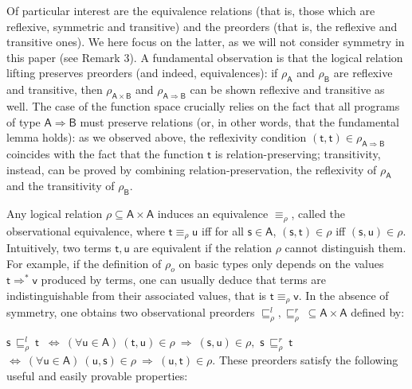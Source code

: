 \documentclass[10pt,a4paper]{amsart}
\begin{document}
Of particular interest are the equivalence relations (that is, those which are reflexive, symmetric and transitive) and the preorders (that is, the reflexive and transitive ones). We here focus on the latter, as we will not consider symmetry in this paper (see Remark 3). A fundamental observation is that the logical relation lifting preserves preorders (and indeed, equivalences): if $\rho_{\mathsf{A}}$ and $\rho_{\mathsf{B}}$ are reflexive and transitive, then $\rho_{\mathsf{A}\times\mathsf{B}}$ and $\rho_{\mathsf{A}\Rightarrow\mathsf{B}}$ can be shown reflexive and transitive as well. The case of the function space crucially relies on the fact that all programs of type $\mathsf{A}\Rightarrow\mathsf{B}$ must preserve relations (or, in other words, that the fundamental lemma holds): as we observed above, the reflexivity condition $(\mathsf{t},\mathsf{t})\in\rho_{\mathsf{A}\Rightarrow\mathsf{B}}$ coincides with the fact that the function $\mathsf{t}$ is relation-preserving; transitivity, instead, can be proved by combining relation-preservation, the reflexivity of $\rho_{\mathsf{A}}$ and the transitivity of $\rho_{\mathsf{B}}$.\par
 
 
 
Any logical relation $\rho\subseteq\mathsf{A}\times\mathsf{A}$ induces an equivalence $\equiv_{\rho}$, called the observational equivalence, where $\mathsf{t}\equiv_{\rho}\mathsf{u}$ iff for all $\mathsf{s}\in\mathsf{A}$, $(\mathsf{s},\mathsf{t})\in\rho$ iff $(\mathsf{s},\mathsf{u})\in\rho$. Intuitively, two terms $\mathsf{t},\mathsf{u}$ are equivalent if the relation $\rho$ cannot distinguish them. For example, if the definition of $\rho_{o}$ on basic types only depends on the values $\mathsf{t}\Rightarrow^{*}\mathsf{v}$ produced by terms, one can usually deduce that terms are indistinguishable from their associated values, that is $\mathsf{t}\equiv_{\rho}\mathsf{v}$. In the absence of symmetry, one obtains two observational preorders $\sqsubseteq^{l}_{\rho},\sqsubseteq^{r}_{\rho}\ \subseteq\mathsf{A}\times%
\mathsf{A}$ defined by:\par
    $\displaystyle\mathsf{s}\ \sqsubseteq^{l}_{\rho}\ \mathsf{t}\ $ $\displaystyle\iff\ (\forall\mathsf{u}\in\mathsf{A})\ (\mathsf{t},\mathsf{u})%
\in\rho\ \Rightarrow\ (\mathsf{s},\mathsf{u})\in\rho,$     $\displaystyle\mathsf{s}\ \sqsubseteq^{r}_{\rho}\ \mathsf{t}\ $ $\displaystyle\iff\ (\forall\mathsf{u}\in\mathsf{A})\ (\mathsf{u},\mathsf{s})%
\in\rho\ \Rightarrow\ (\mathsf{u},\mathsf{t})\in\rho.$    
These preorders satisfy the following useful and easily provable properties:\par
 
\end{document}
